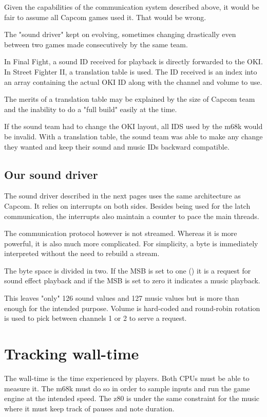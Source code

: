 Given the capabilities of the communication system described above, it would be fair to assume all Capcom games used it. That would be wrong.

The "sound driver" kept on evolving, sometimes changing drastically even between two games made consecutively by the same team. 

In Final Fight, a sound ID received for playback is directly forwarded to the OKI. In Street Fighter II, a translation table is used. The ID received is an index into an array containing the actual OKI ID along with the channel and volume to use.

The merits of a translation table may be explained by the size of Capcom team and the inability to do a "full build" easily at the time.

If the sound team had to change the OKI layout, all IDS used by the m68k would be invalid. With a translation table, the sound team was able to make any change they wanted and keep their sound and music IDs backward compatible.


\subsection{Our sound driver}

The sound driver described in the next pages uses the same architecture as Capcom. It relies on interrupts on both sides. Besides being used for the latch communication, the interrupts also maintain a counter to pace the main threads.


The communication protocol however is not streamed. Whereas it is more powerful, it is also much more complicated. For simplicity, a byte is immediately interpreted without the need to rebuild a stream.

The byte space is divided in two. If the MSB is set to one () it is a request for sound effect playback and if the MSB is set to zero  it indicates a music playback. 

This leaves "only" 126 sound values and 127 music values but is more than enough for the intended purpose. Volume is hard-coded and round-robin rotation is used to pick between channels 1 or 2 to serve a request. 

\section{Tracking wall-time}
The wall-time is the time experienced by players. Both CPUs must be able to measure it. The m68k must do so in order to sample inputs and run the game engine at the intended speed. The z80 is under the same constraint for the music where it must keep track of pauses and note duration. 

